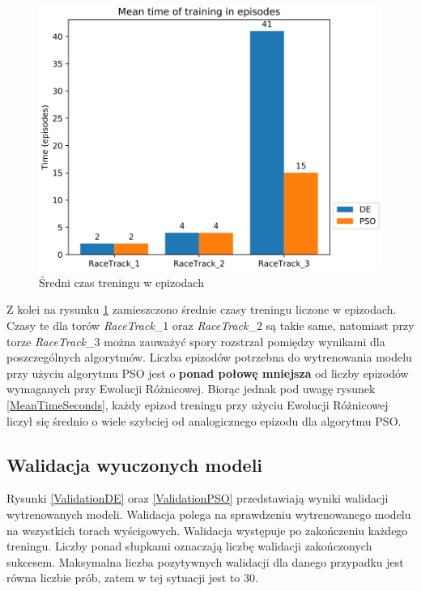 \begin{figure}[H]
\centering
\includegraphics[width=13cm]{resources/figures/train_time_episodes.png}
\caption{Średni czas treningu w epizodach}
\label{MeanTimeEpisodes}
\end{figure}

Z kolei na rysunku \ref{MeanTimeEpisodes} zamieszczono średnie czasy treningu liczone w epizodach. Czasy te dla torów \textit{RaceTrack}\_1 oraz \textit{RaceTrack}\_2 są takie same, natomiast przy torze \textit{RaceTrack}\_3 można zauważyć spory rozstrzał pomiędzy wynikami dla poszczególnych algorytmów. Liczba epizodów potrzebna do wytrenowania modelu przy użyciu algorytmu PSO jest o \textbf{ponad połowę mniejsza} od liczby epizodów wymaganych przy Ewolucji Różnicowej. Biorąc jednak pod uwagę rysunek \ref{MeanTimeSeconds}, każdy epizod treningu przy użyciu Ewolucji Różnicowej liczył się średnio o wiele szybciej od analogicznego epizodu dla algorytmu PSO.

\subsection{Walidacja wyuczonych modeli}
Rysunki \ref{ValidationDE} oraz \ref{ValidationPSO} przedstawiają wyniki walidacji wytrenowanych modeli. Walidacja polega na sprawdzeniu wytrenowanego modelu na wszystkich torach wyścigowych. Walidacja występuje po zakończeniu każdego treningu. Liczby ponad słupkami oznaczają liczbę walidacji zakończonych sukcesem. Maksymalna liczba pozytywnych walidacji dla danego przypadku jest równa liczbie prób, zatem w tej sytuacji jest to 30.

